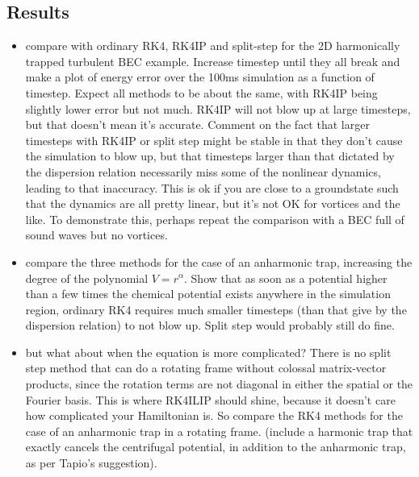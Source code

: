 \subsection{Results}

\begin{itemize}
\item compare with ordinary RK4, RK4IP and split-step for the 2D harmonically trapped turbulent BEC example. Increase timestep until they all break and make a plot of energy error over the 100ms simulation as a function of timestep. Expect all methods to be about the same, with RK4IP being slightly lower error but not much. RK4IP will not blow up at large timesteps, but that doesn't mean it's accurate. Comment on the fact that larger timesteps with RK4IP or split step might be stable in that they don't cause the simulation to blow up, but that timesteps larger than that dictated by the dispersion relation necessarily miss some of the nonlinear dynamics, leading to that inaccuracy. This is ok if you are close to a groundstate such that the dynamics are all pretty linear, but it's not OK for vortices and the like. To demonstrate this, perhaps repeat the comparison with a BEC full of sound waves but no vortices.

\item compare the three methods for the case of an anharmonic trap, increasing the degree of the polynomial $V = r^\alpha$. Show that as soon as a potential higher than a few times the chemical potential exists anywhere in the simulation region, ordinary RK4 requires much smaller timesteps (than that give by the dispersion relation) to not blow up. Split step would probably still do fine.

\item but what about when the equation is more complicated? There is no split step method that can do a rotating frame without colossal matrix-vector products, since the rotation terms are not diagonal in either the spatial or the Fourier basis. This is where RK4ILIP should shine, because it doesn't care how complicated your Hamiltonian is. So compare the RK4 methods for the case of an  anharmonic trap in a rotating frame. (include a harmonic trap that exactly cancels the centrifugal potential, in addition to the anharmonic trap, as per Tapio's suggestion).
\end{itemize}

